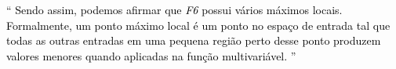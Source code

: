 \documentclass{article}
\begin{document}
\begin{figure}[H]
\begin{floatrow}
{			
		}
	\end{floatrow}
\end{figure}




\newpage
\begin{flushleft}
	\textcolor{black}{
		``
		Sendo assim, podemos afirmar que \emph{F6} possui vários
		máximos locais. Formalmente, um ponto máximo local é um
		ponto no espaço de entrada tal que todas as outras entradas
		em uma pequena região perto desse ponto produzem valores
		menores quando aplicadas na função multivariável.
		''
	}
\end{flushleft}
\end{document}
